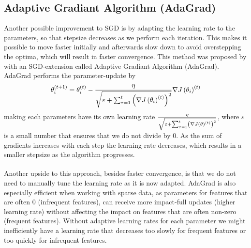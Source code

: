 \subsection{Adaptive Gradiant Algorithm (AdaGrad)}
Another possible improvement to SGD is by adapting the learning rate to the parameters, so that stepsize decreases as we perform each iteration. This makes it possible to move faster initially and afterwards slow down to avoid overstepping the optima, which will result in faster convergence. This method was proposed by \cite{duchi2011adaptive} with an SGD-extension called Adaptive Gradiant Algorithm (AdaGrad). AdaGrad performs the parameter-update by
\begin{equation*}
    \theta^{(t+1)}_i = \theta^{(t)}_i - \frac{\eta}{\sqrt{\varepsilon + \sum_{\tau = 1}^t \left (\nabla J \left (\theta_i\right)^{(t)}\right)^2}} \nabla J \left (\theta_i\right)^{(t)}
\end{equation*}
making each parameters have its own learning rate $\frac{\eta}{\sqrt{\varepsilon + \sum_{\tau = 1}^t \left (\nabla J \left (\theta\right)^{(t)}\right)^2}}$, where $\varepsilon$ is a small number that ensures that we do not divide by $0$. As the sum of gradients increases with each step the learning rate decreases, which results in a smaller stepsize as the algorithm progresses.
\\
\\
Another upside to this approach, besides faster convergence, is that we do not need to manually tune the learning rate as it is now adapted. AdaGrad is also especially efficient when working with sparse data, as parameters for features that are often $0$ (infrequent features), can receive more impact-full updates (higher learning rate) without affecting the impact on features that are often non-zero (frequent features). Without adaptive learning rates for each parameter we might inefficiently have a learning rate that decreases too slowly for frequent features or too quickly for infrequent features.

